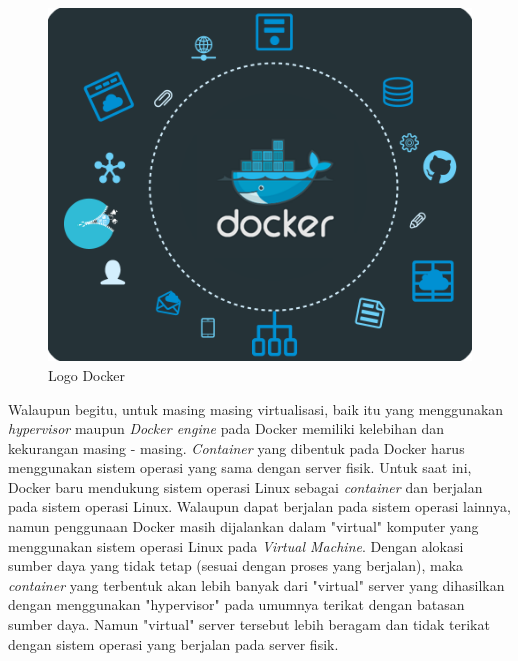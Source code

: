 \begin{figure}
	\centering
	\includegraphics[scale=0.8]{docker.png}
	\caption{Logo Docker\cite{Logo Docker}}
\end{figure}

Walaupun begitu, untuk masing masing virtualisasi, baik itu yang menggunakan \textit{hypervisor} maupun \textit{Docker engine} pada Docker memiliki kelebihan dan kekurangan masing - masing. \textit{Container} yang dibentuk pada Docker harus menggunakan sistem operasi yang sama dengan server fisik. Untuk saat ini, Docker baru mendukung sistem operasi Linux sebagai \textit{container} dan berjalan pada sistem operasi Linux. Walaupun dapat berjalan pada sistem operasi lainnya, namun penggunaan Docker masih dijalankan dalam "virtual" komputer yang menggunakan sistem operasi Linux pada \textit{Virtual Machine}. Dengan alokasi sumber daya yang tidak tetap (sesuai dengan proses yang berjalan), maka \textit{container} yang terbentuk akan lebih banyak dari "virtual" server yang dihasilkan dengan menggunakan "hypervisor" pada umumnya terikat dengan batasan sumber daya. Namun "virtual" server tersebut lebih beragam dan tidak terikat dengan sistem operasi yang berjalan pada server fisik.   
         
